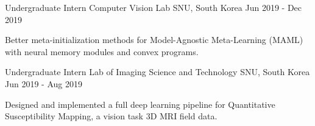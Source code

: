 \begin{cventries}
  \cventry
    {Undergraduate Intern} %
    {Computer Vision Lab} %
    {SNU, South Korea} %
    {Jun 2019 - Dec 2019} %
    {
      \begin{cvitems} %
        \item {Better meta-initialization methods for Model-Agnostic Meta-Learning (MAML) with neural memory modules and convex programs.}
      \end{cvitems}
    }
    
  \cventry
    {Undergraduate Intern} %
    {Lab of Imaging Science and Technology} %
    {SNU, South Korea} %
    {Jun 2019 - Aug 2019} %
    {
      \begin{cvitems} %
        \item {Designed and implemented a full deep learning pipeline for Quantitative Susceptibility Mapping, a vision task 3D MRI field data.}
      \end{cvitems}
    }

\end{cventries}
